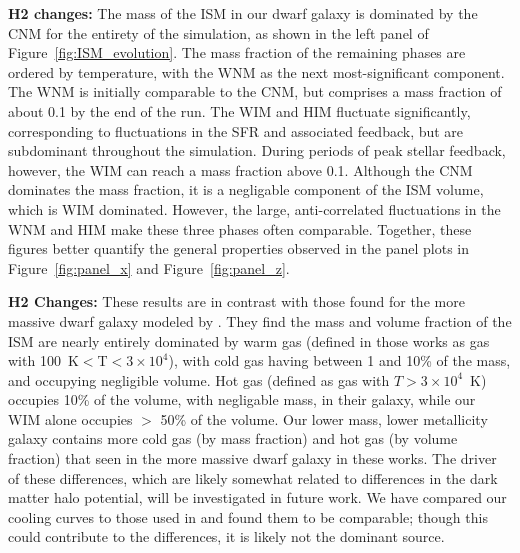 \documentclass[fleqn,usenatbib,useAMS]{mnras}
\begin{document}
\textbf{H2 changes:} The mass of the ISM in our dwarf galaxy is dominated by the CNM for the entirety of the simulation, as shown in the left panel of Figure~\ref{fig:ISM_evolution}. The mass fraction of the remaining phases are ordered by temperature, with the WNM as the next most-significant component. The WNM is initially comparable to the CNM, but comprises a mass fraction of about 0.1 by the end of the run. The WIM and HIM fluctuate significantly, corresponding to fluctuations in the SFR and associated feedback, but are subdominant throughout the simulation. During periods of peak stellar feedback, however, the WIM can reach a mass fraction above 0.1. Although the CNM dominates the mass fraction, it is a negligable component of the ISM volume, which is WIM dominated. However, the large, anti-correlated fluctuations in the WNM and HIM make these three phases often comparable. Together, these figures better quantify the general properties observed in the panel plots in Figure~\ref{fig:panel_x} and Figure~\ref{fig:panel_z}. 

\textbf{H2 Changes:} These results are in contrast with those found for the more massive dwarf galaxy modeled by \citet{Hu2016,Hu2017}. They find the mass and volume fraction of the ISM are nearly entirely dominated by warm gas (defined in those works as gas with 100~K$<$T$< 3\times 10^{4}$), with cold gas having between 1 and 10\% of the mass, and occupying negligible volume. Hot gas (defined as gas with $T > 3\times 10^{4}$~K) occupies 10\% of the volume, with negligable mass, in their galaxy, while our WIM alone occupies $>$ 50\% of the volume. Our lower mass, lower metallicity galaxy contains more cold gas (by mass fraction) and hot gas (by volume fraction) that seen in the more massive dwarf galaxy in these works. The driver of these differences, which are likely somewhat related to differences in the dark matter halo potential, will be investigated in future work. We have compared our cooling curves to those used in \citep{Hu2017} and found them to be comparable; though this could contribute to the differences, it is likely not the dominant source.
\end{document}
